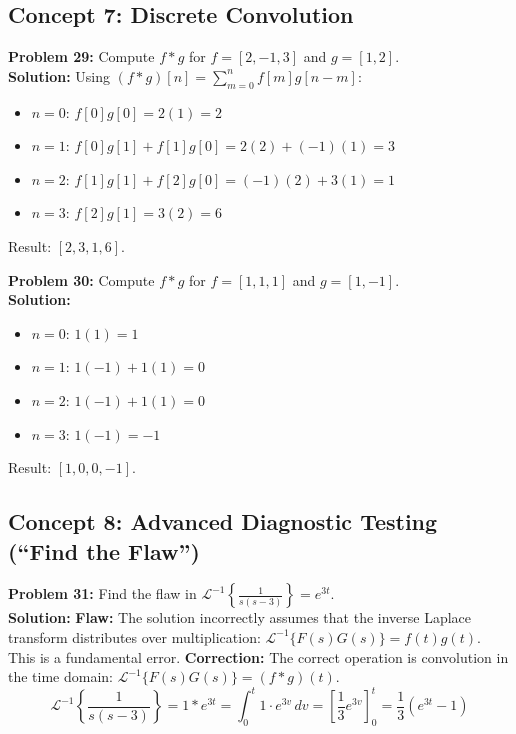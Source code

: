 \documentclass[11pt, letterpaper]{article}
\theoremstyle{definition}
\theoremstyle{remark}
\begin{document}
\subsection{Concept 7: Discrete Convolution}

\textbf{Problem 29:} Compute $f * g$ for $f = [2, -1, 3]$ and $g = [1, 2]$.
\vspace{0.5em}\\
\textbf{Solution:}
Using $(f * g)[n] = \sum_{m=0}^n f[m]g[n-m]$:
\begin{itemize}
    \item $n=0$: $f[0]g[0] = 2(1) = 2$
    \item $n=1$: $f[0]g[1] + f[1]g[0] = 2(2) + (-1)(1) = 3$
    \item $n=2$: $f[1]g[1] + f[2]g[0] = (-1)(2) + 3(1) = 1$
    \item $n=3$: $f[2]g[1] = 3(2) = 6$
\end{itemize}
Result: $[2, 3, 1, 6]$.

\textbf{Problem 30:} Compute $f * g$ for $f = [1, 1, 1]$ and $g = [1, -1]$.
\vspace{0.5em}\\
\textbf{Solution:}
\begin{itemize}
    \item $n=0$: $1(1) = 1$
    \item $n=1$: $1(-1) + 1(1) = 0$
    \item $n=2$: $1(-1) + 1(1) = 0$
    \item $n=3$: $1(-1) = -1$
\end{itemize}
Result: $[1, 0, 0, -1]$.

\subsection{Concept 8: Advanced Diagnostic Testing (``Find the Flaw'')}

\textbf{Problem 31:} Find the flaw in $\mathcal{L}^{-1}\left\{\frac{1}{s(s-3)}\right\} = e^{3t}$.
\vspace{0.5em}\\
\textbf{Solution:}
\textbf{Flaw:} The solution incorrectly assumes that the inverse Laplace transform distributes over multiplication: $\mathcal{L}^{-1}\{F(s)G(s)\} = f(t)g(t)$. This is a fundamental error.
\textbf{Correction:} The correct operation is convolution in the time domain: $\mathcal{L}^{-1}\{F(s)G(s)\} = (f * g)(t)$.
\[ \mathcal{L}^{-1}\left\{\frac{1}{s(s-3)}\right\} = 1 * e^{3t} = \int_0^t 1 \cdot e^{3v} \, dv = \left[ \frac{1}{3}e^{3v} \right]_0^t = \frac{1}{3}(e^{3t} - 1) \]
\end{document}
